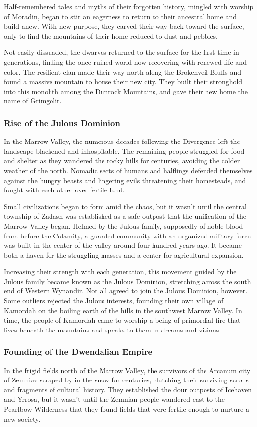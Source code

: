 \documentclass[10pt,a4paper,twoside,bg=print,twocolumn,openany,nodeprecatedcode]{dndbook}
\begin{document}
Half-remembered tales and myths of their forgotten history, mingled with worship of Moradin, began to stir an eagerness to return to their ancestral home and build anew. With new purpose, they carved their way back toward the surface, only to find the mountains of their home reduced to dust and pebbles.

Not easily dissuaded, the dwarves returned to the surface for the first time in generations, finding the once-ruined world now recovering with renewed life and color. The resilient clan made their way north along the Brokenveil Bluffs and found a massive mountain to house their new city. They built their stronghold into this monolith among the Dunrock Mountains, and gave their new home the name of Grimgolir.

\subsubsection{Rise of the Julous Dominion}
In the Marrow Valley, the numerous decades following the Divergence left the landscape blackened and inhospitable. The remaining people struggled for food and shelter as they wandered the rocky hills for centuries, avoiding the colder weather of the north. Nomadic sects of humans and halflings defended themselves against the hungry beasts and lingering evils threatening their homesteads, and fought with each other over fertile land.

Small civilizations began to form amid the chaos, but it wasn't until the central township of Zadash was established as a safe outpost that the unification of the Marrow Valley began. Helmed by the Julous family, supposedly of noble blood from before the Calamity, a guarded community with an organized military force was built in the center of the valley around four hundred years ago. It became both a haven for the struggling masses and a center for agricultural expansion.

Increasing their strength with each generation, this movement guided by the Julous family became known as the Julous Dominion, stretching across the south end of Western Wynandir. Not all agreed to join the Julous Dominion, however. Some outliers rejected the Julous interests, founding their own village of Kamordah on the boiling earth of the hills in the southwest Marrow Valley. In time, the people of Kamordah came to worship a being of primordial fire that lives beneath the mountains and speaks to them in dreams and visions.

\subsubsection{Founding of the Dwendalian Empire}
In the frigid fields north of the Marrow Valley, the survivors of the Arcanum city of Zemniaz scraped by in the snow for centuries, clutching their surviving scrolls and fragments of cultural history. They established the dour outposts of Icehaven and Yrrosa, but it wasn't until the Zemnian people wandered east to the Pearlbow Wilderness that they found fields that were fertile enough to nurture a new society.
\end{document}

